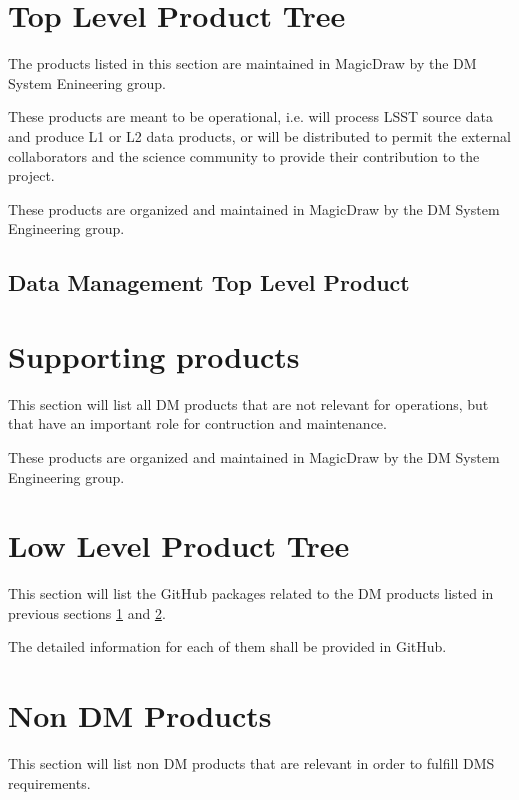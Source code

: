 \section{Top Level Product Tree}\label{sec:top}

The products listed in this section are maintained in MagicDraw by the DM System Enineering group. 

These products are meant to be operational, i.e. will process LSST source data and produce L1 or L2 data products, or will be distributed to permit the external collaborators and the science community to provide their contribution to the project.

These products are organized and maintained in MagicDraw by the DM System Engineering group.

\subsection{Data Management Top Level Product}\label{sec:dmtop}




\newpage
\section{Supporting products}\label{sec:sups}

This section will list all DM products that are not relevant for operations, but that have an important role for contruction and maintenance.

These products are organized and maintained in MagicDraw by the DM System Engineering group.

%


\newpage
\section{Low Level Product Tree}\label{sec:low}

This section will list the GitHub packages related to the DM products listed in previous sections \ref{sec:top} and \ref{sec:sups}.

The detailed information for each of them shall be provided in GitHub.

%


\newpage
\section{Non DM Products}

This section will list non DM products that are relevant in order to fulfill DMS requirements.
